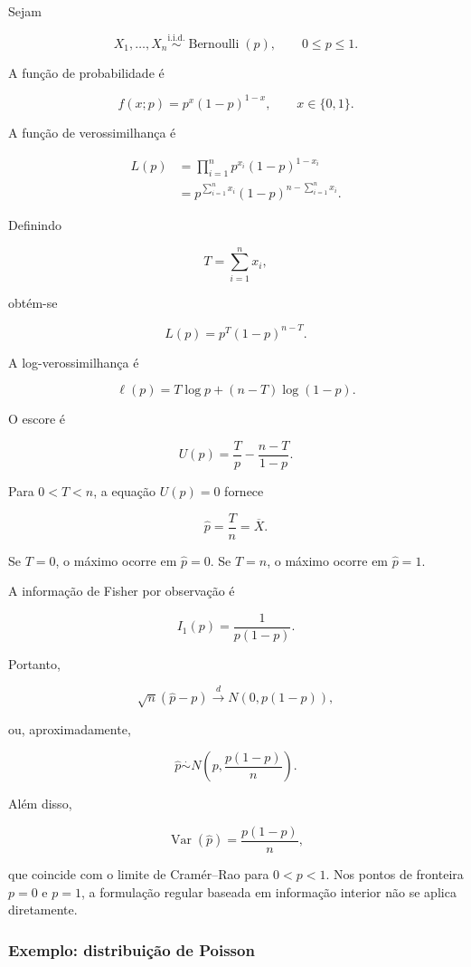 \documentclass[
  letterpaper,
  DIV=11,
  numbers=noendperiod]{scrreprt}
\begin{document}
Sejam

\[X_1,\ldots,X_n
\overset{\mathrm{i.i.d.}}{\sim}
\operatorname{Bernoulli}(p),
\qquad 0\leq p\leq 1.\]

A função de probabilidade é

\[f(x;p)
=
p^x(1-p)^{1-x},
\qquad x\in\{0,1\}.\]

A função de verossimilhança é

\[\begin{aligned}
L(p)
&=
\prod_{i=1}^n
p^{x_i}(1-p)^{1-x_i}\\
&=
p^{\sum_{i=1}^n x_i}
(1-p)^{
n-\sum_{i=1}^n x_i
}.
\end{aligned}\]

Definindo

\[T
=
\sum_{i=1}^n x_i,\]

obtém-se

\[L(p)
=
p^T(1-p)^{n-T}.\]

A log-verossimilhança é

\[\ell(p)
=
T\log p
+
(n-T)\log(1-p).\]

O escore é

\[U(p)
=
\frac{T}{p}
-
\frac{n-T}{1-p}.\]

Para \(0<T<n\), a equação \(U(p)=0\) fornece

\[\widehat p
=
\frac{T}{n}
=
\overline X.\]

Se \(T=0\), o máximo ocorre em \(\widehat p=0\). Se \(T=n\), o máximo
ocorre em \(\widehat p=1\).

A informação de Fisher por observação é

\[I_1(p)
=
\frac{1}{p(1-p)}.\]

Portanto,

\[\sqrt n
(\widehat p-p)
\xrightarrow{d}
N
\left(
0,
p(1-p)
\right),\]

ou, aproximadamente,

\[\widehat p
\overset{\cdot}{\sim}
N
\left(
p,
\frac{p(1-p)}{n}
\right).\]

Além disso,

\[\operatorname{Var}(\widehat p)
=
\frac{p(1-p)}{n},\]

que coincide com o limite de Cramér--Rao para \(0<p<1\). Nos pontos de
fronteira \(p=0\) e \(p=1\), a formulação regular baseada em informação
interior não se aplica diretamente.

\subsubsection{Exemplo: distribuição de
Poisson}\label{exemplo-distribuiuxe7uxe3o-de-poisson}
\end{document}
